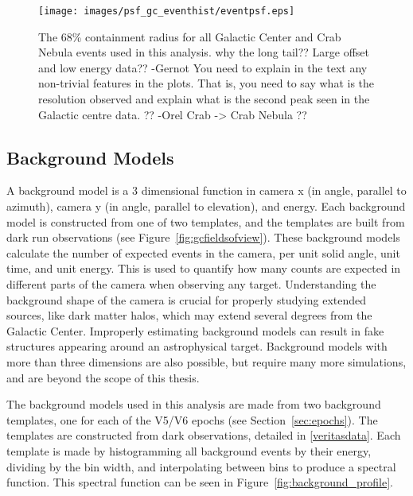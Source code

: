     \begin{figure}[ht]
      \centering
      \texttt{[image: images/psf\_gc\_eventhist/eventpsf.eps]}
      \caption[Crab and Galactic Center Event PSFs]{
        The 68\% containment radius for all Galactic Center and Crab Nebula events used in this analysis.
        {\color{red}why the long tail?? Large offset and low energy data?? -Gernot}
        {\color{red}You need to explain in the text any non-trivial features in the plots. That is, you need to say what is the resolution observed and explain what is the second peak seen in the Galactic centre data. ?? -Orel}
        {\color{red}Crab -> Crab Nebula ??}
      }
      \label{fig:gc_psf_hist}
    \end{figure}
  
  \FloatBarrier
  
  \subsection{Background Models}\label{background_production}
  
    A background model is a 3 dimensional function in camera x (in angle, parallel to azimuth), camera y (in angle, parallel to elevation), and energy.
    Each background model is constructed from one of two templates, and the templates are built from dark run observations (see Figure~\ref{fig:gcfieldsofview}).
    These background models calculate the number of expected events in the camera, per unit solid angle, unit time, and unit energy.
    This is used to quantify how many counts are expected in different parts of the camera when observing any target.
    Understanding the background shape of the camera is crucial for properly studying extended sources, like dark matter halos, which may extend several degrees from the Galactic Center.
    Improperly estimating background models can result in fake structures appearing around an astrophysical target.
    Background models with more than three dimensions are also possible, but require many more simulations, and are beyond the scope of this thesis.
    
    The background models used in this analysis are made from two background templates, one for each of the V5/V6 epochs (see Section~\ref{sec:epochs}).
    The templates are constructed from dark observations, detailed in \ref{veritasdata}.
    Each template is made by histogramming all background events by their energy, dividing by the bin width, and interpolating between bins to produce a spectral function.
    This spectral function can be seen in Figure~\ref{fig:background_profile}.
    
